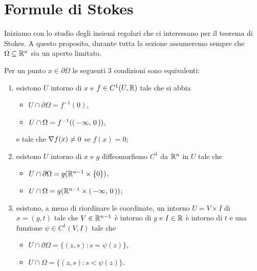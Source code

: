 \section{Formule di Stokes}\label{sezione:FormuleStokes}

Iniziamo con lo studio degli insiemi regolari che ci interessano per il teorema di Stokes.
A questo proposito, durante tutta la sezione assumeremo sempre che $\Omega\subseteq\mathbb R^n$ sia un aperto limitato.

\begin{theorem}\label{thm:PtRegEquiv}
	Per un punto $x\in \partial \Omega$ le seguenti $3$ condizioni sono equivalenti:
	\begin{enumerate}
		\item esistono $U$ intorno di $x$ e $f\in C^1(U,\mathbb R)$ tale che si abbia
			\begin{itemize}
				\item $U\cap \partial \Omega=f^{-1}(0)$,
				\item $U\cap \Omega=f^{-1}(\left(\,-\infty,\,0\,\right))$,
			\end{itemize}
			e tale che $\nabla f(x)\neq 0$ se $f(x)=0$;\label{PRE:i}
		\item esistono $U$ intorno di $x$ e $g$ diffeomorfismo $C^1$ da $\mathbb R^n$ in $U$ tale che\label{PRE:ii}
			\begin{itemize}
				\item $U\cap \partial \Omega = g(\mathbb R^{n-1}\times\{0\})$,
				\item $U\cap \Omega = g(\mathbb R^{n-1}\times\left(\,-\infty,\,0\,\right))$;
			\end{itemize}
		\item esistono, a meno di riordinare le coordinate, un intorno $U=V\times I$ di $x=(y,t)$ tale che $V\in\mathbb R^{n-1}$ è intorno di $y$
			e $I\in\mathbb R$ è intorno di $t$ e una funzione $\psi\in C^1(V,I)$ tale che
			\begin{itemize}
				\item $U\cap \partial \Omega = \{(z,s):s=\psi(z)\}$,
				\item $U\cap \Omega = \{(z,s):s<\psi(z)\}$.
			\end{itemize}\label{PRE:iii}
	\end{enumerate}
\end{theorem}

